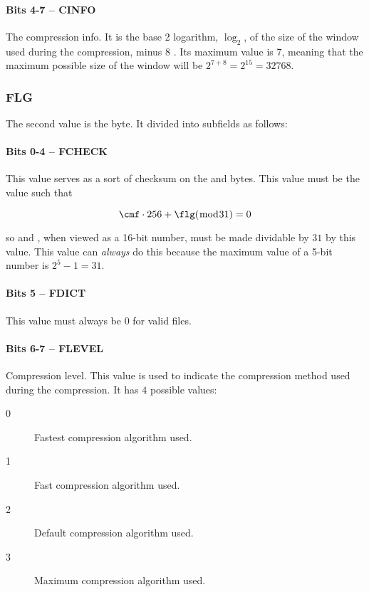 \paragraph{Bits 4-7 -- CINFO}

The compression info. It is the base 2 logarithm, $\log_2$, of the
size of the \lzone window used during the  compression, minus
$8$ . Its maximum value is $7$, meaning that the maximum possible size
of the \lzone window will be $2^{7 + 8} = 2^{15} = 32768$.

\subsubsection{FLG}

The second value is the \flg byte. It divided into subfields as
follows:

\paragraph{Bits 0-4 -- FCHECK}

This value serves as a sort of checksum on the \cmf and \flg bytes. This
value must be the value such that

\begin{equation*}
  \text{\cmf} \cdot 256 + \text{\flg} (\bmod 31) = 0
\end{equation*}

so \cmf and \flg, when viewed as a 16-bit number, must be made dividable
by $31$ by this value. This value can \textit{always} do this because
the maximum value of a 5-bit number is $2^5 - 1 = 31$.

\paragraph{Bits 5 -- FDICT}

This value must always be $0$ for valid \png files.

\paragraph{Bits 6-7 -- FLEVEL}

Compression level. This value is used to indicate the compression
method used during the  compression. It has $4$ possible
values:

\begin{description}
\item[0] Fastest compression algorithm used.
\item[1] Fast compression algorithm used.
\item[2] Default compression algorithm used.
\item[3] Maximum compression algorithm used.
\end{description}

